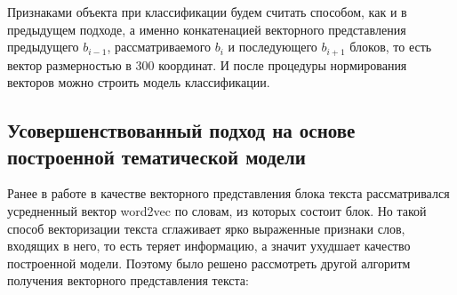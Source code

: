 \documentclass[14pt]{matmex-diploma-custom}
\begin{document}
Признаками объекта при классификации будем считать способом, как и в предыдущем подходе, а именно конкатенацией векторного представления предыдущего $b_{i-1}$, рассматриваемого $b_i$ и последующего $b_{i+1}$ блоков, то есть вектор размерностью в 300 координат. И после процедуры нормирования векторов можно строить модель классификации.

\subsection{Усовершенствованный подход на основе построенной тематической модели}
Ранее в работе в качестве векторного представления блока текста рассматривался усредненный вектор word2vec по словам, из которых состоит блок. Но такой способ векторизации текста сглаживает ярко выраженные признаки слов, входящих в него, то есть теряет информацию, а значит ухудшает качество построенной модели. Поэтому было решено рассмотреть другой алгоритм получения векторного представления текста:
\end{document}
